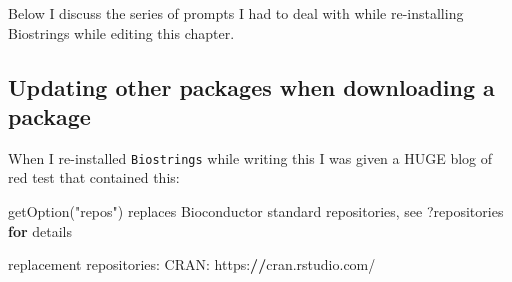 \documentclass[
]{book}
\newenvironment{Shaded}{\begin{snugshade}}{\end{snugshade}}
\newcommand{\ControlFlowTok}[1]{\textcolor[rgb]{0.13,0.29,0.53}{\textbf{#1}}}
\newcommand{\ErrorTok}[1]{\textcolor[rgb]{0.64,0.00,0.00}{\textbf{#1}}}
\newcommand{\NormalTok}[1]{#1}
\newcommand{\SpecialCharTok}[1]{\textcolor[rgb]{0.00,0.00,0.00}{#1}}
\newcommand{\StringTok}[1]{\textcolor[rgb]{0.31,0.60,0.02}{#1}}
\begin{document}
Below I discuss the series of prompts I had to deal with while re-installing Biostrings while editing this chapter.

\hypertarget{updating-other-packages-when-downloading-a-package}{%
\subsection{Updating other packages when downloading a package}\label{updating-other-packages-when-downloading-a-package}}

When I re-installed \texttt{Biostrings} while writing this I was given a HUGE blog of red test that contained this:

\begin{Shaded}
\begin{Highlighting}[]
\StringTok{\textquotesingle{}getOption("repos")\textquotesingle{}}\NormalTok{ replaces Bioconductor standard repositories, see }\StringTok{\textquotesingle{}?repositories\textquotesingle{}} \ControlFlowTok{for}
\NormalTok{details}

\NormalTok{replacement repositories}\SpecialCharTok{:}
\NormalTok{    CRAN}\SpecialCharTok{:}\NormalTok{ https}\SpecialCharTok{:}\ErrorTok{//}\NormalTok{cran.rstudio.com}\SpecialCharTok{/}


\end{Highlighting}
\end{Shaded}
\end{document}
